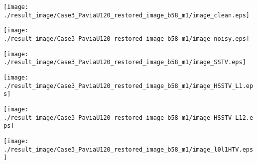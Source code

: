\begin{figure*}[t]
    \begin{center}
        \begin{minipage}{0.150\hsize}
            \centerline{\texttt{[image: ./result\_image/Case3\_PaviaU120\_restored\_image\_b58\_m1/image\_clean.eps]}} %
        \end{minipage}
        \begin{minipage}{0.150\hsize}
            \centerline{\texttt{[image: ./result\_image/Case3\_PaviaU120\_restored\_image\_b58\_m1/image\_noisy.eps]}} %
        \end{minipage}
        \begin{minipage}{0.150\hsize}
            \centerline{\texttt{[image: ./result\_image/Case3\_PaviaU120\_restored\_image\_b58\_m1/image\_SSTV.eps]}} %
        \end{minipage}
        \begin{minipage}{0.150\hsize}
            \centerline{\texttt{[image: ./result\_image/Case3\_PaviaU120\_restored\_image\_b58\_m1/image\_HSSTV\_L1.eps]}} %
        \end{minipage}
        \begin{minipage}{0.150\hsize}
            \centerline{\texttt{[image: ./result\_image/Case3\_PaviaU120\_restored\_image\_b58\_m1/image\_HSSTV\_L12.eps]}} %
        \end{minipage}
        \begin{minipage}{0.150\hsize}
            \centerline{\texttt{[image: ./result\_image/Case3\_PaviaU120\_restored\_image\_b58\_m1/image\_l0l1HTV.eps]}} %
        \end{minipage}
        \begin{minipage}{0.055\hsize}
            \centerline{\hspace{\hsize}} %
		\end{minipage}

        \vspace{1mm}


\end{center}
\end{figure*}
